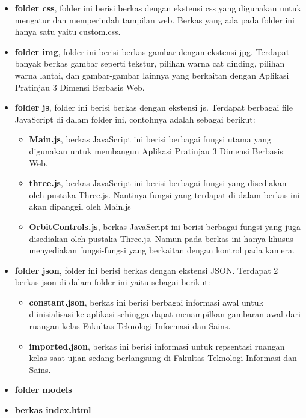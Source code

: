 \begin{itemize}
	\item {\bf folder css}, folder ini berisi berkas dengan ekstensi css yang digunakan untuk mengatur dan memperindah tampilan web. Berkas yang ada pada folder ini hanya satu yaitu custom.css.
	\item {\bf folder img}, folder ini berisi berkas gambar dengan ekstensi jpg. Terdapat banyak berkas gambar seperti tekstur, pilihan warna cat dinding, pilihan warna lantai, dan gambar-gambar lainnya yang berkaitan dengan Aplikasi Pratinjau 3 Dimensi Berbasis Web.
	\item {\bf folder js}, folder ini berisi berkas dengan ekstensi js. Terdapat berbagai file JavaScript di dalam folder ini, contohnya adalah sebagai berikut:
		\begin{itemize}
			\item {\bf Main.js}, berkas JavaScript ini berisi berbagai fungsi utama yang digunakan untuk membangun Aplikasi Pratinjau 3 Dimensi Berbasis Web.
			\item {\bf three.js}, berkas JavaScript ini berisi berbagai fungsi yang disediakan oleh pustaka Three.js. Nantinya fungsi yang terdapat di dalam berkas ini akan dipanggil oleh Main.js
			\item {\bf OrbitControls.js}, berkas JavaScript ini berisi berbagai fungsi yang juga disediakan oleh pustaka Three.js. Namun pada berkas ini hanya khusus menyediakan fungsi-fungsi yang berkaitan dengan kontrol pada kamera.
		\end{itemize}
	\item {\bf folder json}, folder ini berisi berkas dengan ekstensi JSON. Terdapat 2 berkas json di dalam folder ini yaitu sebagai berikut:
		\begin{itemize}
			\item {\bf constant.json}, berkas ini berisi berbagai informasi awal untuk diinisialisasi ke aplikasi sehingga dapat menampilkan gambaran awal dari ruangan kelas Fakultas Teknologi Informasi dan Sains.
			\item {\bf imported.json}, berkas ini berisi informasi untuk repsentasi ruangan kelas saat ujian sedang berlangsung di Fakultas Teknologi Informasi dan Sains.
		\end{itemize}
	\item {\bf folder models}
	\item {\bf berkas index.html}
\end{itemize}